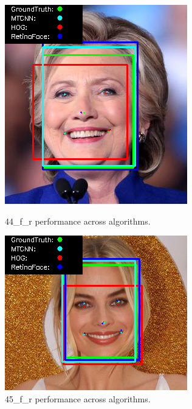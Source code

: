 \documentclass{l4proj}
\begin{document}
\begin{appendices}
\begin{figure}[h!]
  \centering
  \begin{minipage}{0.49\textwidth}
    \centering
     \includegraphics[width=\textwidth]{images/appendix/44.png}
    \caption{44\_f\_r performance across algorithms.}
    \label{whoopi_result}
  \end{minipage}
    \hfill
    \begin{minipage}{0.49\textwidth}
    \centering
     \includegraphics[width=\textwidth]{images/appendix/45.png}
    \caption{45\_f\_r performance across algorithms.}
    \label{whoopi_result}
  \end{minipage}
\end{figure}


\end{appendices}
\end{document}
